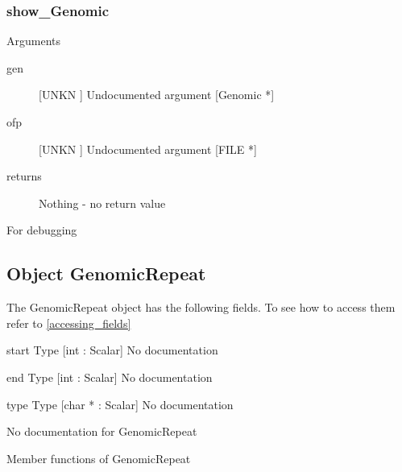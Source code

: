 \subsubsection{show_Genomic}

Arguments
\begin{description}
\item[gen] [UNKN ] Undocumented argument [Genomic *]
\item[ofp] [UNKN ] Undocumented argument [FILE *]
\item[returns] Nothing - no return value
\end{description}
For debugging


\subsection{Object GenomicRepeat}

\label{object_GenomicRepeat}

The GenomicRepeat object has the following fields. To see how to access them refer to \ref{accessing_fields}
\begin{description}
\item{start} Type [int : Scalar] No documentation

\item{end} Type [int : Scalar] No documentation

\item{type} Type [char * : Scalar] No documentation

\end{description}
No documentation for GenomicRepeat

Member functions of GenomicRepeat

